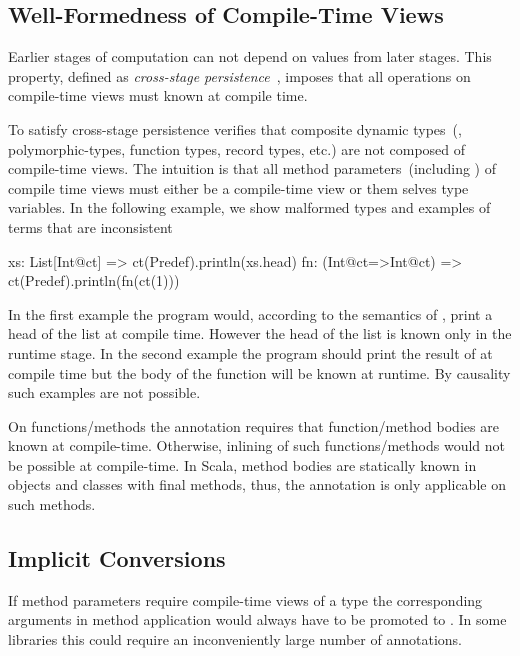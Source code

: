 \subsection{Well-Formedness of Compile-Time Views}
\label{sct:wf-ctv}

Earlier stages of computation can not depend on values from later stages. This property,
 defined as \emph{cross-stage persistence}~\cite{taha_multi-stage_1997,westbrook2010mint},
 imposes that all operations on compile-time views must known at compile time.

To satisfy cross-stage persistence \tool verifies that composite dynamic
 types~(\eg, polymorphic-types, function types, record types, etc.) are not composed
 of compile-time views. The intuition is that all method parameters~(including )
 of compile time views must either be a compile-time view or them selves type variables. In the following example,
 we show malformed types and examples of terms that are inconsistent\begin{lstparagraph}
xs: List[Int@ct]     => ct(Predef).println(xs.head)
fn: (Int@ct=>Int@ct) => ct(Predef).println(fn(ct(1)))
\end{lstparagraph}

In the first example the program would, according to the semantics of , print a head of the list at compile time.
 However the head of the list is known only in the runtime stage. In the second example the program should
 print the result of  at compile time but the body of the function will
 be known at runtime. By causality such examples are not possible.

On functions/methods the  annotation requires that function/method bodies are known at compile-time.
 Otherwise, inlining of such functions/methods would not be possible at compile-time. In Scala,
 method bodies are statically known in objects and classes with final methods, thus, the 
 annotation is only applicable on such methods.

\subsection{Implicit Conversions}
\label{sct:implicits}

If method parameters require compile-time views of a type the corresponding arguments
 in method application would always have to be promoted to .
 In some libraries this could require an inconveniently large number
 of annotations.

